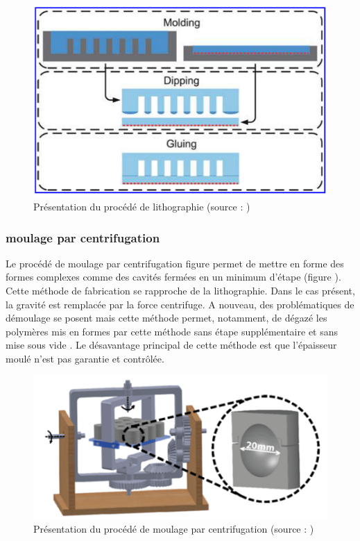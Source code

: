 \documentclass[10pt, a4paper]{article}
\begin{document}
\begin{figure}[ht!]
\centering
\includegraphics[scale=0.5]{ImageIntro/lithograp.PNG}
\caption{ Présentation du procédé de lithographie (source : \cite{Marchese2015})}
\label{fig:lithographie}
\end{figure}

\subsubsection{moulage par centrifugation}

            Le procédé de moulage par centrifugation figure permet de mettre en forme des formes complexes comme des cavités fermées en un minimum d'étape \cite{Zhao2015} (figure ). Cette méthode de fabrication se rapproche de la lithographie. Dans le cas présent, la gravité est remplacée par la force centrifuge. A nouveau, des problématiques de démoulage se posent mais cette méthode permet, notamment, de dégazé les polymères mis en formes par cette méthode sans étape supplémentaire et sans mise sous vide \cite{Schmitt2018} \cite{Mazzeo2013}. Le désavantage principal de cette méthode est que l'épaisseur moulé n'est pas garantie et contrôlée.
            \cite{Vu2014}

\begin{figure}[ht!]
\centering
\includegraphics[scale=0.5]{ImageIntro/centrifugationMoulage.png}
\caption{ Présentation du procédé de moulage par centrifugation (source : \cite{Zhao2015})}
\label{fig:centrifugation}
\end{figure}
        
\end{document}
